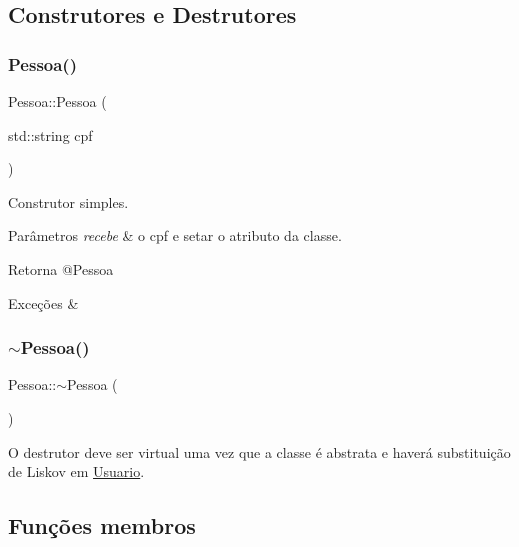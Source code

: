 \subsection{Construtores e Destrutores}
\mbox{\label{class_pessoa_a53285703ed58f6b634eb75da443cd1d6}} 
\subsubsection{\texorpdfstring{Pessoa()}{Pessoa()}}
{\footnotesize\ttfamily Pessoa\+::\+Pessoa (\begin{DoxyParamCaption}\item[{std\+::string}]{cpf }\end{DoxyParamCaption})}

Construtor simples. 
\begin{DoxyParams}{Parâmetros}
{\em recebe} & o cpf e setar o atributo da classe. \\
\hline
\end{DoxyParams}
\begin{DoxyReturn}{Retorna}
@\+Pessoa 
\end{DoxyReturn}

\begin{DoxyExceptions}{Exceções}
{\em } & \\
\hline
\end{DoxyExceptions}
\mbox{\label{class_pessoa_a1501b01d184497075fe5ce042da3ae44}} 
\subsubsection{\texorpdfstring{$\sim$Pessoa()}{~Pessoa()}}
{\footnotesize\ttfamily Pessoa\+::$\sim$\+Pessoa (\begin{DoxyParamCaption}{ }\end{DoxyParamCaption})\hspace{0.3cm}{\ttfamily [virtual]}}

O destrutor deve ser virtual uma vez que a classe é abstrata e haverá substituição de Liskov em \mbox{\hyperlink{class_usuario}{Usuario}}. 

\subsection{Funções membros}
\mbox{\label{class_pessoa_ac04dffcb5114b117daf83061f8349f5d}} 
